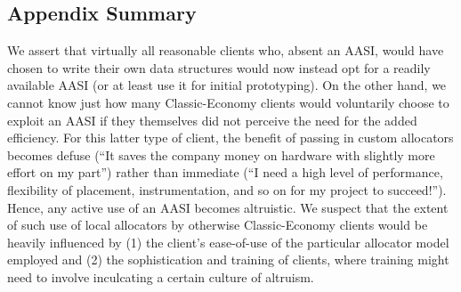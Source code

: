 \subsection{Appendix Summary}
We assert that virtually all reasonable clients who, absent an AASI, would have
chosen to write their own data structures would now instead opt for a readily
available AASI (or at least use it for initial prototyping). On the other hand, we
cannot know just how many Classic-Economy clients would voluntarily choose to
exploit an AASI if they themselves did not perceive the need for the added efficiency.
For this latter type of client, the benefit of passing in custom allocators becomes
defuse (“It saves the company money on hardware with slightly more effort on my
part”) rather than immediate (“I need a high level of performance, flexibility of
placement, instrumentation, and so on for my project to succeed!”). Hence, any
active use of an AASI becomes altruistic. We suspect that the extent of such use of
local allocators by otherwise Classic-Economy clients would be heavily influenced by
(1) the client’s ease-of-use of the particular allocator model employed and (2) the
sophistication and training of clients, where training might need to involve
inculcating a certain culture of altruism.


